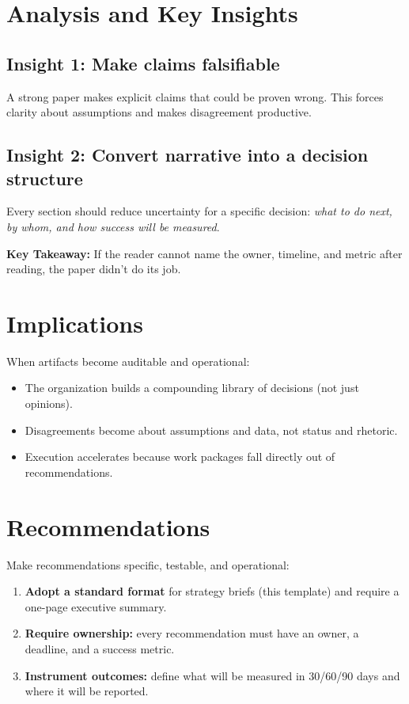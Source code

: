 \documentclass[11pt]{article}
\begin{document}
\section{Analysis and Key Insights}
\subsection{Insight 1: Make claims falsifiable}
A strong paper makes explicit claims that could be proven wrong. This forces clarity about assumptions and makes disagreement productive.

\subsection{Insight 2: Convert narrative into a decision structure}
Every section should reduce uncertainty for a specific decision: \emph{what to do next, by whom, and how success will be measured}.

\begin{keytakeaway}
  \textbf{Key Takeaway:} If the reader cannot name the owner, timeline, and metric after reading, the paper didn't do its job.
\end{keytakeaway}

\section{Implications}
When artifacts become auditable and operational:
\begin{itemize}
  \item The organization builds a compounding library of decisions (not just opinions).
  \item Disagreements become about assumptions and data, not status and rhetoric.
  \item Execution accelerates because work packages fall directly out of recommendations.
\end{itemize}

\section{Recommendations}
Make recommendations specific, testable, and operational:
\begin{enumerate}
  \item \textbf{Adopt a standard format} for strategy briefs (this template) and require a one-page executive summary.
  \item \textbf{Require ownership:} every recommendation must have an owner, a deadline, and a success metric.
  \item \textbf{Instrument outcomes:} define what will be measured in 30/60/90 days and where it will be reported.
\end{enumerate}
\end{document}

